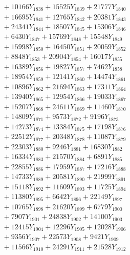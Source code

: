\documentclass[a4paper,10pt]{article}
\begin{document}
{\begin{align}
&\;  + 10166 Y_{1838} + 15525 Y_{1839} + 21777 Y_{1840} \\[0.3ex]
&\;  + 16695 Y_{1841} + 12765 Y_{1842} + 20381 Y_{1843} \\[0.3ex]
&\;  + 24341 Y_{1844} + 18507 Y_{1845} + 15306 Y_{1846} \\[0.3ex]
&\;  + 6430 Y_{1847} + 15769 Y_{1848} + 15548 Y_{1849} \\[0.3ex]
&\;  + 15998 Y_{1850} + 16450 Y_{1851} + 20059 Y_{1852} \\[0.3ex]
&\;  + 8848 Y_{1853} + 20904 Y_{1854} + 16017 Y_{1855} \\[0.3ex]
&\;  + 16389 Y_{1856} + 19827 Y_{1857} + 7462 Y_{1858} \\[0.5ex]\allowbreak
&\;  + 18954 Y_{1859} + 12141 Y_{1860} + 14474 Y_{1861} \\[0.3ex]
&\;  + 10896 Y_{1862} + 21694 Y_{1863} + 17311 Y_{1864} \\[0.3ex]
&\;  + 13940 Y_{1865} + 12954 Y_{1866} + 19033 Y_{1867} \\[0.3ex]
&\;  + 15207 Y_{1868} + 24611 Y_{1869} + 11460 Y_{1870} \\[0.3ex]
&\;  + 14809 Y_{1871} + 9573 Y_{1872} + 9196 Y_{1873} \\[0.3ex]
&\;  + 14273 Y_{1874} + 13384 Y_{1875} + 17198 Y_{1876} \\[0.3ex]
&\;  + 22512 Y_{1877} + 20348 Y_{1878} + 11087 Y_{1879} \\[0.3ex]
&\;  + 22303 Y_{1880} + 9246 Y_{1881} + 16830 Y_{1882} \\[0.3ex]
&\;  + 16334 Y_{1883} + 21570 Y_{1884} + 6891 Y_{1885} \\[0.3ex]
&\;  + 22855 Y_{1886} + 17959 Y_{1887} + 17216 Y_{1888} \\[0.5ex]\allowbreak
&\;  + 14733 Y_{1889} + 20581 Y_{1890} + 21999 Y_{1891} \\[0.3ex]
&\;  + 15118 Y_{1892} + 11609 Y_{1893} + 11725 Y_{1894} \\[0.3ex]
&\;  + 11380 Y_{1895} + 6642 Y_{1896} + 22149 Y_{1897} \\[0.3ex]
&\;  + 10765 Y_{1898} + 21620 Y_{1899} + 6779 Y_{1900} \\[0.3ex]
&\;  + 7907 Y_{1901} + 24838 Y_{1902} + 14100 Y_{1903} \\[0.3ex]
&\;  + 12415 Y_{1904} + 12296 Y_{1905} + 12028 Y_{1906} \\[0.3ex]
&\;  + 9356 Y_{1907} + 22573 Y_{1908} + 9421 Y_{1909} \\[0.3ex]
&\;  + 11566 Y_{1910} + 24291 Y_{1911} + 21528 Y_{1912} \\[0.3ex]

\end{align}}
\end{document}

